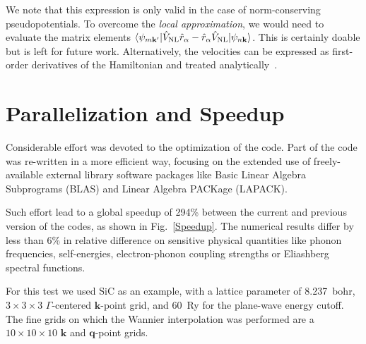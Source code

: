 \documentclass[final,3p,times,twocolumn]{elsarticle}
\begin{document}
We note that this expression is only valid in the case of norm-conserving pseudopotentials. 
To overcome the \textit{local approximation}, we would need to evaluate the matrix elements $\langle \psi_{m\mathbf{k'}}  | \hat{V}_{\rm NL}\hat{r}_\alpha- \hat{r}_\alpha \hat{V}_{\rm NL} | \psi_{n\mathbf{k}}  \rangle$. This is certainly doable but is left for future work. Alternatively, the velocities can be expressed as first-order derivatives of the Hamiltonian and treated analytically~\cite{Blount1962,Yates2007,Janssen2016}. 



\section{Parallelization and Speedup}\label{para}

Considerable effort was devoted to the optimization of the code. Part of the code was re-written in a more efficient way, focusing on the extended use of freely-available external library software packages like Basic Linear Algebra Subprograms (BLAS) and Linear Algebra PACKage (LAPACK).

Such effort lead to a global speedup of 294\% between the current and previous version of the codes, as shown in Fig.~\ref{Speedup}.
The numerical results differ by less than 6\% in relative difference on sensitive physical quantities like phonon frequencies, self-energies, electron-phonon coupling strengths or Eliashberg spectral functions. 

For this test we used SiC as an example, with a lattice parameter of 8.237~bohr, $3\times3\times3$ $\Gamma$-centered $\mathbf{k}$-point grid, and 60~Ry for the plane-wave energy cutoff. The fine grids on which the Wannier interpolation was performed are a $10\times10\times10$ $\mathbf{k}$ and $\mathbf{q}$-point grids.
\end{document}
